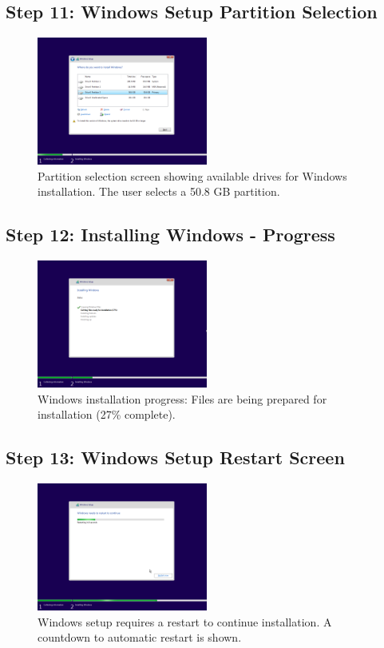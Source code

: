 \documentclass{article}
\begin{document}
\subsection{Step 11: Windows Setup Partition Selection}
\begin{figure}[H]
    \centering
    \includegraphics[width=0.5\textwidth]{2024-09-17_14-22-49.png}
    \caption{Partition selection screen showing available drives for Windows installation. The user selects a 50.8 GB partition.}
\end{figure}

\subsection{Step 12: Installing Windows - Progress}
\begin{figure}[H]
    \centering
    \includegraphics[width=0.5\textwidth]{2024-09-17_14-24-52.png}
    \caption{Windows installation progress: Files are being prepared for installation (27\% complete).}
\end{figure}

\subsection{Step 13: Windows Setup Restart Screen}
\begin{figure}[H]
    \centering
    \includegraphics[width=0.5\textwidth]{2024-09-17_14-28-01.png}
    \caption{Windows setup requires a restart to continue installation. A countdown to automatic restart is shown.}
\end{figure}
\end{document}
